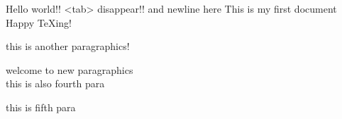\documentclass{article}
\begin{document}
  Hello    world!!	<tab> disappear!!
  and newline here
  This is my first document\\
  Happy \TeX ing!\par
  this is another paragraphics!

  welcome to new paragraphics\\
  \newpage
  \indent this is also fourth para\par
  \noindent this is fifth para
\end{document}
